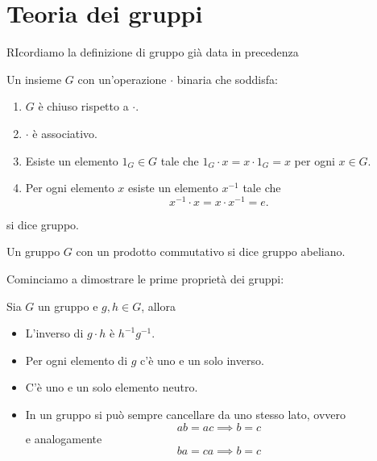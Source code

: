 \documentclass[11pt]{scrartcl}
\begin{document}
	\newpage
	
	\section{Teoria dei gruppi}
	RIcordiamo la definizione di gruppo già data in precedenza
	
	\begin{definition}[Gruppo]
		Un insieme $G$ con un'operazione $\cdot$ binaria che soddisfa:
		\begin{enumerate}
			\item $G$ è chiuso rispetto a $\cdot$.
			\item $\cdot$ è associativo. 
			\item Esiste un elemento $1_G\in G$ tale che $1_G\cdot x=x\cdot 1_G=x$ per ogni $x\in G$.
			\item Per ogni elemento $x$ esiste un elemento $x^{-1}$ tale che 
			$$x^{-1}\cdot x=x\cdot x^{-1}=e.$$
		\end{enumerate}
		si dice gruppo.
	\end{definition}
	\begin{definition}
		Un gruppo $G$ con un prodotto commutativo si dice gruppo abeliano.
	\end{definition}
	Cominciamo a dimostrare le prime proprietà dei gruppi:
	\begin{lemma}
		Sia $G$ un gruppo e $g,h\in G$, allora 
		\begin{itemize}
			\item L'inverso di $g\cdot h$ è $h^{-1}g^{-1}$.
			\item Per ogni elemento di $g$ c'è uno e un solo inverso.
			\item C'è uno e un solo elemento neutro.
			\item In un gruppo si può sempre cancellare da uno stesso lato, ovvero
			$$ab=ac\implies b=c$$
			e analogamente
			$$ba=ca \implies b=c$$ 
		\end{itemize}
	\end{lemma}
\end{document}
